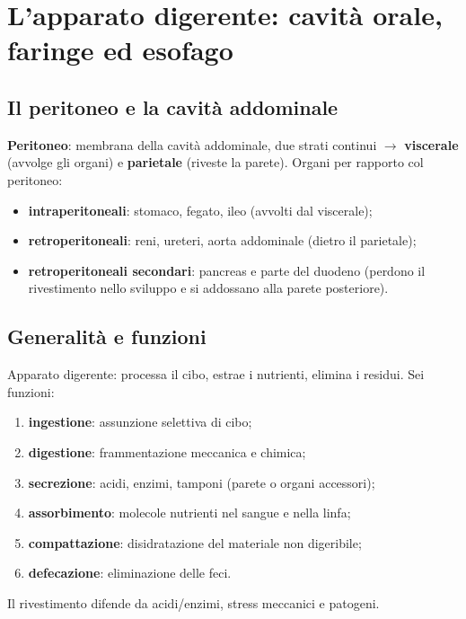 \chapter{L'apparato digerente: cavità orale, faringe ed esofago}

\section{Il peritoneo e la cavità addominale}

\textbf{Peritoneo}: membrana della cavità addominale, due strati continui $\rightarrow$
\textbf{viscerale} (avvolge gli organi) e \textbf{parietale} (riveste la parete). Organi per
rapporto col peritoneo:
\begin{itemize}
  \item \textbf{intraperitoneali}: stomaco, fegato, ileo (avvolti dal viscerale);
  \item \textbf{retroperitoneali}: reni, ureteri, aorta addominale (dietro il parietale);
  \item \textbf{retroperitoneali secondari}: pancreas e parte del duodeno (perdono il rivestimento
    nello sviluppo e si addossano alla parete posteriore).
\end{itemize}

\section{Generalità e funzioni}

Apparato digerente: processa il cibo, estrae i nutrienti, elimina i residui. Sei funzioni:
\begin{enumerate}
  \item \textbf{ingestione}: assunzione selettiva di cibo;
  \item \textbf{digestione}: frammentazione meccanica e chimica;
  \item \textbf{secrezione}: acidi, enzimi, tamponi (parete o organi accessori);
  \item \textbf{assorbimento}: molecole nutrienti nel sangue e nella linfa;
  \item \textbf{compattazione}: disidratazione del materiale non digeribile;
  \item \textbf{defecazione}: eliminazione delle feci.
\end{enumerate}
Il rivestimento difende da acidi/enzimi, stress meccanici e patogeni.

